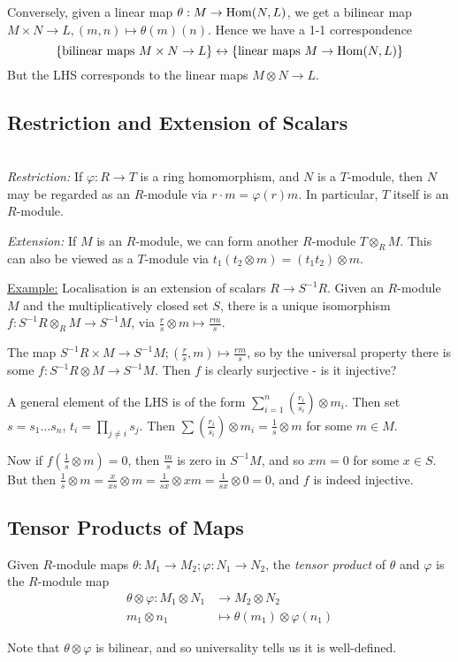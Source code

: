 \documentclass[10pt,a4paper]{article}
\begin{document}
Conversely, given a linear map $\theta: M \to \operatorname{Hom}(N,L)$, we get a bilinear map $M \times N \to L, (m,n)\mapsto \theta(m)(n)$. Hence we have a 1-1 correspondence
\[\{\text{bilinear maps }M\times N \to L\} \leftrightarrow \{\text{linear maps } M \to \operatorname{Hom}(N,L)\}\]
But the LHS corresponds to the linear maps $M \otimes N \to L$.

\subsection{Restriction and Extension of Scalars}
\begin{definition}\hspace*{0cm}\\
  \emph{Restriction:} If $\varphi:R \to T$ is a ring homomorphism, and $N$ is a $T$-module, then $N$ may be regarded as an $R$-module via $r\cdot m = \varphi(r)m$. In particular, $T$ itself is an $R$-module.

  \emph{Extension:} If $M$ is an $R$-module, we can form another $R$-module $T \otimes_R M$. This can also be viewed as a $T$-module via $t_1(t_2\otimes m) = (t_1t_2)\otimes m$.
\end{definition}
\underline{Example:} Localisation is an extension of scalars $R \to S^{-1}R$. Given an $R$-module $M$ and the multiplicatively closed set $S$, there is a unique isomorphism $f:S^{-1}R \otimes_R M \to S^{-1}M$, via $\frac{r}{s}\otimes m \mapsto \frac{rm}{s}$.

The map $S^{-1}R \times M \to S^{-1}M; (\frac{r}{s}, m)\mapsto \frac{rm}{s}$, so by the universal property there is some $f:S^{-1}R\otimes M \to S^{-1}M$. Then $f$ is clearly surjective - is it injective?

A general element of the LHS is of the form $\sum_{i=1}^n \left(\frac{r_i}{s_i}\right)\otimes m_i$. Then set $s = s_1\ldots s_n$, $t_i = \prod_{j \neq i} s_j$. Then $\sum \left(\frac{r_i}{s_i}\right) \otimes m_i = \frac{1}{s}\otimes m$ for some $m \in M$.

Now if $f(\frac{1}{s}\otimes m) = 0$, then $\frac{m}{s}$ is zero in $S^{-1}M$, and so $xm = 0$ for some $x \in S$. But then $\frac{1}{s}\otimes m = \frac{x}{xs}\otimes m = \frac{1}{sx}\otimes xm = \frac{1}{sx}\otimes 0 = 0$, and $f$ is indeed injective.

\subsection{Tensor Products of Maps}
\begin{definition}
  Given $R$-module maps $\theta:M_1 \to M_2; \varphi:N_1\to N_2$, the \emph{tensor product} of $\theta$ and $\varphi$ is the $R$-module map
  \begin{align*}
    \theta \otimes \varphi: M_1 \otimes N_1 &\to M_2 \otimes N_2\\
    m_1 \otimes n_1 &\mapsto \theta(m_1)\otimes \varphi(n_1)
  \end{align*}
\end{definition}
Note that $\theta \otimes \varphi$ is bilinear, and so universality tells us it is well-defined.
\end{document}
